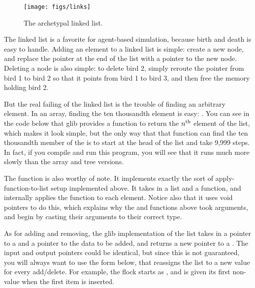 \begin{figure}[htb]
\begin{center}
\texttt{[image: figs/links]}
\end{center}
\caption{The archetypal linked list.}
\label{listfig}
\end{figure}

The linked list is a favorite for agent-based simulation, because birth
and death is easy to handle.  Adding an element to a linked list is
simple: create a new node, and replace the  pointer at
the end of the list with a pointer to the new node. Deleting a node is also simple:
to delete bird 2, simply reroute the  pointer from bird 1 to bird 2 so
that it points from bird 1 to bird 3, and then free the memory holding
bird 2.

But the real failing of the linked list is the trouble of finding an
arbitrary element.  In an array, finding the ten thousandth element is
easy: .
You can see in the code below
that glib provides a  function to return the
$n^{\rm th}$ element of the list, which makes it look simple,
but the only way that that function can find the ten
thousandth member of the  is to start at the head of the list
and take 9,999 
steps. In fact, if you compile and run this
program, you will see that it runs much more slowly than the array and tree 
versions.

 The  function is also worthy of note. It implements
exactly the sort of apply-function-to-list setup implemented above. It
takes in a list and a function, and internally applies the function to
each element. Notice also that it uses void pointers to do this, which
explains why the  and  functions
above took  arguments, and begin by casting their arguments to
their correct type.

 As for adding and removing, the glib implementation of the list takes in
a pointer to a  and a pointer to the data to be added, and
returns a new pointer to a . The input and output pointers
could be identical, but since this is not guaranteed, you will always
want to use the form below, that reassigns the list to a new value for
every add/delete. For example, the flock starts as , and is
given its first non- value when the first item is inserted.




